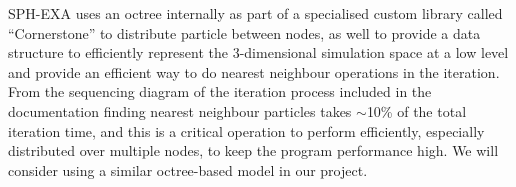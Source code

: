SPH-EXA uses an octree internally as part of a specialised custom library called ``Cornerstone'' to distribute particle between nodes, as well to provide a data structure to efficiently represent the 3-dimensional simulation space at a low level and provide an efficient way to do nearest neighbour operations in the iteration. From the sequencing diagram of the iteration process included in the documentation finding nearest neighbour particles takes $\sim$10\% of the total iteration time, and this is a critical operation to perform efficiently, especially distributed over multiple nodes, to keep the program performance high. We will consider using a similar octree-based model in our project. 

